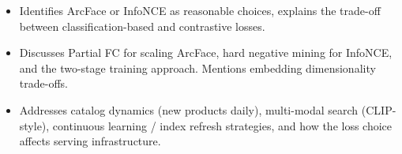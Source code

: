 \begin{interviewq}

\goodgreat
\begin{itemize}
    \item {} Identifies ArcFace or InfoNCE as reasonable choices, explains the trade-off between classification-based and contrastive losses.
    \item {} Discusses Partial FC for scaling ArcFace, hard negative mining for InfoNCE, and the two-stage training approach. Mentions embedding dimensionality trade-offs.
    \item {} Addresses catalog dynamics (new products daily), multi-modal search (CLIP-style), continuous learning / index refresh strategies, and how the loss choice affects serving infrastructure.
\end{itemize}

\end{interviewq}

